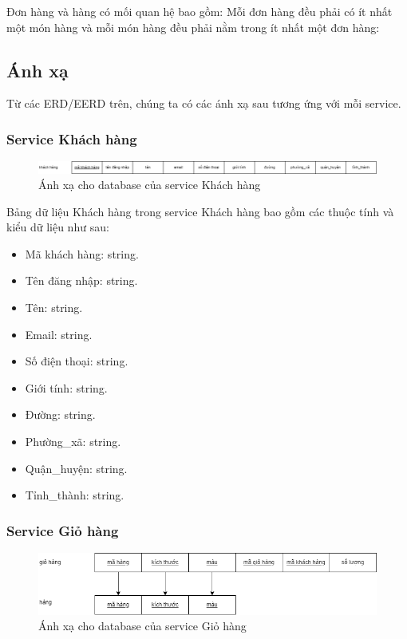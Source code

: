 Đơn hàng và hàng có mối quan hệ bao gồm: Mỗi đơn hàng đều phải có ít nhất một món hàng và mỗi món hàng đều phải nằm trong ít nhất một đơn hàng:


\subsection{Ánh xạ}
\par Từ các ERD/EERD trên, chúng ta có các ánh xạ sau tương ứng với mỗi service.

\subsubsection{Service Khách hàng}
\begin{figure}[!htp]
	\begin{center}
		\includegraphics[width=1\textwidth]{img/database/mapping/mapping-customer.png}
		\newline
		\caption{Ánh xạ cho database của service Khách hàng}
	\end{center}
\end{figure}

Bảng dữ liệu Khách hàng trong service Khách hàng bao gồm các thuộc tính và kiểu dữ liệu như sau:
\begin{itemize}
	\item Mã khách hàng: string.
	\item Tên đăng nhập: string.
	\item Tên: string.
	\item Email: string.
	\item Số điện thoại: string.
	\item Giới tính: string.
	\item Đường: string.
	\item Phường\_xã: string.
	\item Quận\_huyện: string.
	\item Tỉnh\_thành: string.
\end{itemize}

\subsubsection{Service Giỏ hàng}
\begin{figure}[!htp]
	\begin{center}
		\includegraphics[width=1\textwidth]{img/database/mapping/mapping-cart.png}
		\newline
		\caption{Ánh xạ cho database của service Giỏ hàng}
	\end{center}
\end{figure}

